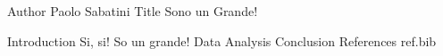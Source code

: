 Author Paolo Sabatini 
Title	Sono un Grande!
	
Introduction	Si, si! So un grande!
Data
Analysis
Conclusion
References ref.bib
